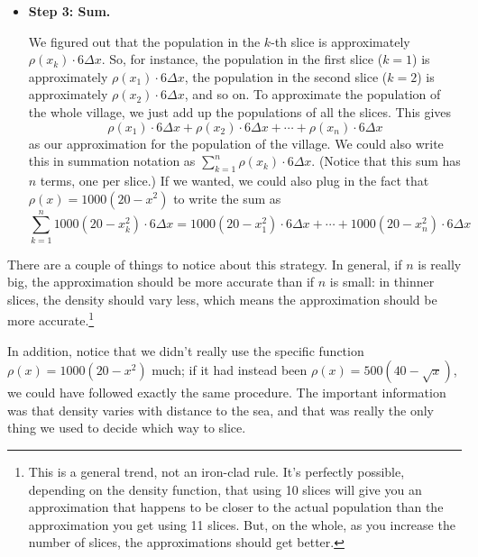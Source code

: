 \documentclass[main]{subfiles}
\begin{document}
\begin{enumerate}
\begin{solution}
\begin{itemize}
    \item \textbf{Step 3: Sum.}

      We figured out that the population in the $k$-th slice is
      approximately $\rho(x_k) \cdot 6 \Delta x$.  So, for instance, the
      population in the first slice ($k = 1$) is approximately $\rho(x_1)
      \cdot 6 \Delta x$, the population in the second slice ($k = 2$) is
      approximately $\rho(x_2) \cdot 6 \Delta x$, and so on.  To
      approximate the population of the whole village, we just add up the
      populations of all the slices.  This gives
      \[ \boxed{\rho(x_1) \cdot 6 \Delta x + \rho(x_2) \cdot 6 \Delta x +
        \cdots + \rho(x_n) \cdot 6 \Delta x}\] as our approximation for
      the population of the village.  We could also write this in
      summation notation as $\displaystyle \sum_{k=1}^n \rho(x_k) \cdot 6
      \Delta x$.  (Notice that this sum has $n$ terms, one per slice.)  If
      we wanted, we could also plug in the fact that $\rho(x) = 1000 (20 -
      x^2)$ to write the sum as
      \[ \boxed{\sum_{k=1}^n 1000 (20 - x_k^2) \cdot 6 \Delta x = 1000 (20
        - x_1^2) \cdot 6 \Delta x + \cdots + 1000 (20 - x_n^2) \cdot 6
        \Delta x}\]
    \end{itemize}
    There are a couple of things to notice about this strategy.  In
    general, if $n$ is really big, the approximation should be more
    accurate than if $n$ is small: in thinner slices, the density should
    vary less, which means the approximation should be more
    accurate.\footnote{This is a general trend, not an iron-clad rule.
      It's perfectly possible, depending on the density function, that
      using 10 slices will give you an approximation that happens to be
      closer to the actual population than the approximation you get using
      11 slices.  But, on the whole, as you increase the number of slices,
      the approximations should get better.}

    In addition, notice that we didn't really use the specific function
    $\rho(x) = 1000 (20 - x^2)$ much; if it had instead been $\rho(x) =
    500 (40 - \sqrt{x})$, we could have followed exactly the same
    procedure.  The important information was that density varies with
    distance to the sea, and that was really the only thing we used to
    decide which way to slice.
  \end{solution}
\end{enumerate}












\newpage
\end{document}
